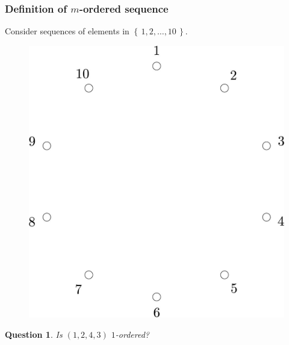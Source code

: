 \documentclass{beamer}
\theoremstyle{plain}
\newtheorem{question}[theorem]{Question}
\theoremstyle{definition}
\theoremstyle{remark}
\renewcommand{\'}{\hspace{0.5mm}'}		%
\renewcommand{\Set}[1]{\left\{\,#1\,\right\}}	%
\begin{document}
\begin{frame}
\frametitle{Definition of $m$-ordered sequence}

	Consider sequences of elements in $\Set{1,2,\hdots, 10}$. 

	\begin{figure}
		\includegraphics[scale=0.1]{circ_10.jpg}
	\end{figure}
	
	\begin{question}
		Is $(1,2,4,3)$ $1$-ordered?
	\end{question}
	
\end{frame}

\end{document}
